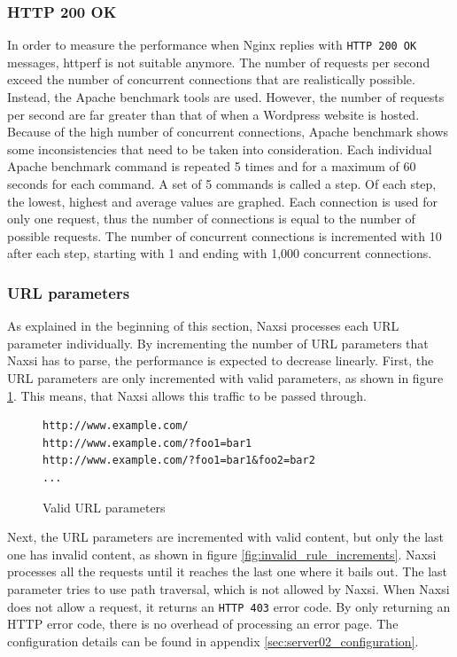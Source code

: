 \documentclass[Methods]{subfiles}
\begin{document}
\subsubsection{HTTP 200 OK}
\label{sec:HTTP 200 OK}
In order to measure the performance when Nginx replies with \verb+HTTP 200 OK+ messages, httperf is not suitable anymore. The number of requests per second exceed the number of concurrent connections that are realistically possible. Instead, the Apache benchmark tools are used. However, the number of requests per second are far greater than that of when a Wordpress website is hosted. Because of the high number of concurrent connections, Apache benchmark shows some inconsistencies that need to be taken into consideration. Each individual Apache benchmark command is repeated 5 times and for a maximum of 60 seconds for each command. A set of 5 commands is called a step. Of each step, the lowest, highest and average values are graphed. Each connection is used for only one request, thus the number of connections is equal to the number of possible requests. The number of concurrent connections is incremented with 10 after each step, starting with 1 and ending with 1,000 concurrent connections.

\subsubsection{URL parameters}
As explained in the beginning of this section, Naxsi processes each \ac{URL} parameter individually. By incrementing the number of \ac{URL} parameters that Naxsi has to parse, the performance is expected to decrease linearly. First, the \ac{URL} parameters are only incremented with valid parameters, as shown in figure \ref{fig:valid_rule_increments}. This means, that Naxsi allows this traffic to be passed through. 

\begin{figure}[H]
\caption{Valid URL parameters}
\begin{verbatim}
http://www.example.com/
http://www.example.com/?foo1=bar1
http://www.example.com/?foo1=bar1&foo2=bar2
...
\end{verbatim}
\label{fig:valid_rule_increments}
\end{figure}

Next, the \ac{URL} parameters are incremented with valid content, but only the last one has invalid content, as shown in figure \ref{fig:invalid_rule_increments}. Naxsi processes all the requests until it reaches the last one where it bails out. The last parameter tries to use path traversal, which is not allowed by Naxsi. When Naxsi does not allow a request, it returns an \verb+HTTP 403+ error code. By only returning an HTTP error code, there is no overhead of processing an error page. The configuration details can be found in appendix \ref{sec:server02_configuration}.
\end{document}
